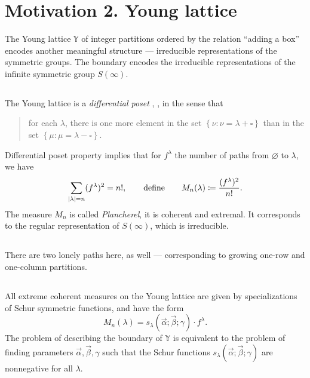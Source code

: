 \documentclass[letterpaper,11pt,oneside,reqno]{article}
\numberwithin{equation}{section}
\theoremstyle{definition}
\begin{document}
\section{Motivation 2. Young lattice}

The Young lattice $\mathbb{Y}$ of integer partitions ordered
by the relation ``adding a box''
encodes another meaningful structure --- irreducible representations of the symmetric groups.
The boundary encodes the irreducible representations of the infinite symmetric group $S(\infty)$.

\subsection{}
The Young lattice is a \emph{differential poset} \cite{stanley1988differential},
\cite{fomin1994duality}, 
in the sense that 
\begin{quote}
	for each $\lambda$, there is one more element in the set
	$\left\{ \nu\colon\nu=\lambda+\square \right\}$ than
	in the set $\left\{ \mu\colon\mu=\lambda-\square \right\}$. 
\end{quote}
Differential poset 
property implies that 
for $f^\lambda$ the number of paths from $\varnothing$ to $\lambda$, we have
\begin{equation*}
	\sum_{|\lambda|=n}(f^\lambda)^2=n!, \qquad \textnormal{define}\qquad
	M_n(\lambda)\coloneqq\frac{(f^\lambda)^2}{n!}.
\end{equation*}
The measure $M_n$ is called \emph{Plancherel}, it is coherent
and extremal. It corresponds to the regular representation of $S(\infty)$,
which is irreducible.

\subsection{}

There are two lonely paths here, as well --- corresponding to growing 
one-row and one-column partitions.

\subsection{}

All extreme coherent measures on the Young lattice are given by specializations
of Schur symmetric functions, and have the form
\begin{equation*}
	M_n(\lambda)=s_\lambda(\vec \alpha;\vec \beta;\gamma)\cdot f^\lambda.
\end{equation*}
The problem of describing the boundary of $\mathbb{Y}$ is equivalent to
the problem of finding parameters $\vec \alpha,\vec \beta,\gamma$ such that
the Schur functions $s_\lambda(\vec \alpha;\vec \beta;\gamma)$ are nonnegative
for all $\lambda$.
\end{document}
